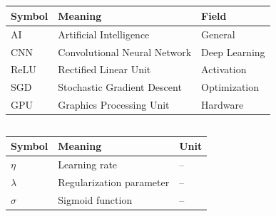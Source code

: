 
	
	\subsection*{}
	
	\begin{tabular}{lll}
		\toprule
		Symbol & Meaning & Field \\
		\midrule
		AI      & Artificial Intelligence          & General \\
		CNN     & Convolutional Neural Network     & Deep Learning \\
		ReLU    & Rectified Linear Unit            & Activation \\
		SGD     & Stochastic Gradient Descent      & Optimization \\
		GPU     & Graphics Processing Unit         & Hardware \\
		\bottomrule
	\end{tabular}
	
	\vspace{1cm}
	\subsection*{}
	
	\begin{tabular}{lll}
		\toprule
		Symbol & Meaning & Unit \\
		\midrule
		$\eta$    & Learning rate             & -- \\
		$\lambda$ & Regularization parameter  & -- \\
		$\sigma$  & Sigmoid function          & -- \\
		\bottomrule
	\end{tabular}
	

